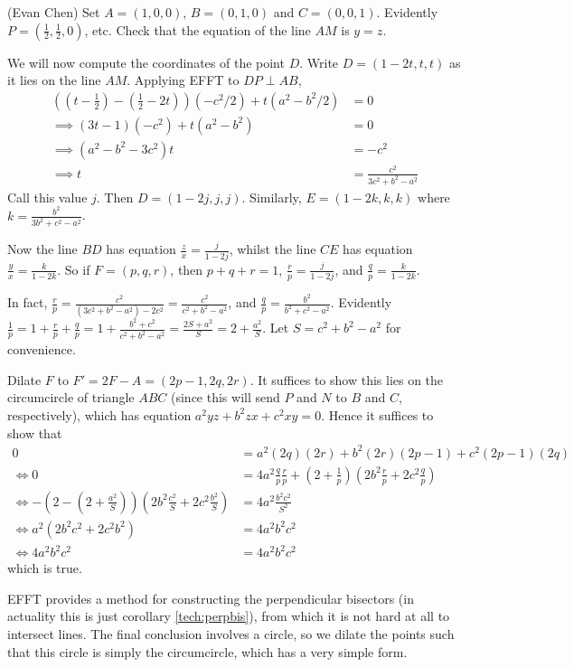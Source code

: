 \begin{soln}
  (Evan Chen) Set $A=(1,0,0)$, $B=(0,1,0)$ and $C=(0,0,1)$.  Evidently $P=(\frac12, \frac12, 0)$, etc.  Check that the equation of the line $AM$ is $y=z$.

  We will now compute the coordinates of the point $D$.  Write $D=(1-2t, t, t)$ as it lies on the line $AM$.  Applying EFFT to $DP \perp AB$,
  \begin{align*}
  \left(\left(t-\frac12\right) - \left(\frac12 - 2t\right)\right)\left(-c^2/2\right) + t\left(a^2-b^2/2\right) &= 0\\
  \implies (3t-1)(-c^2) + t(a^2-b^2) &= 0 \\
  \implies (a^2-b^2-3c^2)t &= -c^2 \\
  \implies t &= \frac{c^2}{3c^2+b^2-a^2}
  \end{align*}
  Call this value $j$.  Then $D=(1-2j, j, j)$.  Similarly, $E=(1-2k, k, k)$ where $k= \frac{b^2}{3b^2+c^2-a^2}$.

  Now the line $BD$ has equation $\frac zx = \frac{j}{1-2j}$, whilst the line $CE$ has equation $\frac yx = \frac{k}{1-2k}$.  So if $F=(p,q,r)$, then $p+q+r=1$, $\frac rp = \frac{j}{1-2j}$, and $\frac qp = \frac{k}{1-2k}$.

  In fact, $\frac rp = \frac{c^2}{(3c^2+b^2-a^2)-2c^2} = \frac{c^2}{c^2+b^2-a^2}$, and $\frac qp = \frac{b^2}{b^2+c^2-a^2}$.  Evidently $\frac 1p = 1 + \frac rp + \frac qp = 1+\frac{b^2+c^2}{c^2+b^2-a^2} = \frac{2S+a^2}{S} = 2 +\frac{a^2}{S}$.  Let $S = c^2+b^2-a^2$ for convenience.

  Dilate $F$ to $F'=2F-A = (2p-1, 2q, 2r)$.  It suffices to show this lies on the circumcircle of triangle $ABC$ (since this will send $P$ and $N$ to $B$ and $C$, respectively), which has equation $a^2yz + b^2zx + c^2xy=0$.  Hence it suffices to show that
  \begin{align*}
  0 &= a^2(2q)(2r) + b^2(2r)(2p-1) + c^2(2p-1)(2q) \\
  \iff 0 &= 4a^2\frac qp \frac rp + (2+\frac1p)(2b^2 \frac rp + 2c^2 \frac qp) \\
  \iff -(2-(2+\frac{a^2}{S}))(2b^2 \frac{c^2}{S} + 2c^2 \frac{b^2}{S}) &= 4a^2 \frac{b^2c^2}{S^2}  \\
  \iff a^2(2b^2c^2 + 2c^2b^2) &= 4a^2b^2c^2 \\
  \iff 4a^2b^2c^2 &= 4a^2b^2c^2
  \end{align*}
  which is true.
\end{soln}

\seccm
EFFT provides a method for constructing the perpendicular bisectors (in actuality this is just corollary \ref{tech:perpbis}), from which it is not hard at all to intersect lines.  The final conclusion involves a circle, so we dilate the points such that this circle is simply the circumcircle, which has a very simple form.
